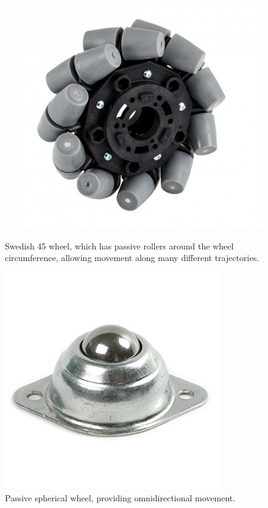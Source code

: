 \documentclass[a4paper]{article}
\begin{document}
\begin{figure}[h]
\centering
\begin{minipage}[t]{0.45\textwidth}
\centering
\includegraphics[scale=0.25]{omni_wheel}
\caption{Swedish 45 wheel, which has passive rollers around the wheel circumference, allowing movement along many different trajectories.}
\end{minipage}
\hspace{1cm}
\begin{minipage}[t]{0.45\textwidth}
\centering
\includegraphics[scale=0.3]{ball_bearing}
\caption{Passive spherical wheel, providing omnidirectional movement.}
\end{minipage}
\end{figure}
\end{document}
